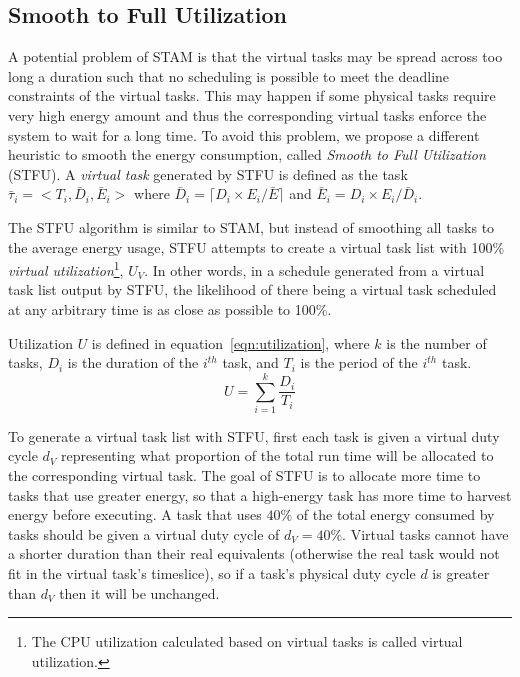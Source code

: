\subsection{Smooth to Full Utilization}

A potential problem of \textsc{STAM} is that the virtual tasks may be spread across too long a duration such that no scheduling is possible to meet the deadline constraints of the virtual tasks. This may happen if some physical tasks require very high energy amount and thus the corresponding virtual tasks enforce the system to wait for a long time. To avoid this problem, we propose a different heuristic to smooth the energy consumption, called \emph{Smooth to Full Utilization} (\textsc{STFU}).  A \emph{virtual task} generated by \textsc{STFU} is defined as the task $\bar{\tau}_i = <T_i, \bar{D}_i, \bar{E}_i>$ where $\bar{D}_i = \lceil D_i \times  E_i / \bar{E} \rceil$ and $\bar{E}_i = D_i \times  E_i / \bar{D}_i$.

The \textsc{STFU} algorithm is similar to \textsc{STAM}, but instead of smoothing all tasks to the average energy usage, \textsc{STFU} attempts to create a virtual task list with 100\% \emph{virtual utilization}\footnote{The CPU utilization calculated based on virtual tasks is called virtual utilization.}, $U_V$.  In other words, in a schedule generated from a virtual task list output by \textsc{STFU}, the likelihood of there being a virtual task scheduled at any arbitrary time is as close as possible to 100\%.

Utilization $U$ is defined in equation~\ref{eqn:utilization}, where $k$ is the number of tasks, $D_i$ is the duration of the $i^{th}$ task, and $T_i$ is the period of the $i^{th}$ task.
\begin{equation}
\label{eqn:utilization}
U = \sum_{i=1}^{k} \frac{D_i}{T_i}
\end{equation}

To generate a virtual task list with \textsc{STFU}, first each task is given a virtual duty cycle $d_V$ representing what proportion of the total run time will be allocated to the corresponding virtual task.  The goal of \textsc{STFU} is to allocate more time to tasks that use greater energy, so that a high-energy task has more time to harvest energy before executing.  A task that uses $40\%$ of the total energy consumed by tasks should be given a virtual duty cycle of $d_V=40\%$.  Virtual tasks cannot have a shorter duration than their real equivalents (otherwise the real task would not fit in the virtual task's timeslice), so if a task's physical duty cycle $d$ is greater than $d_V$ then it will be unchanged.

